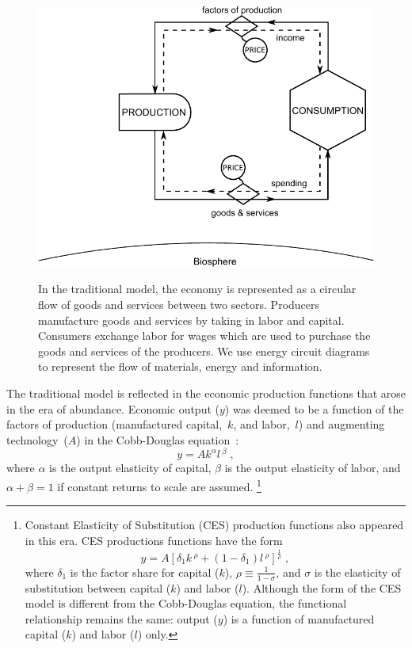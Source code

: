 \begin{figure}[!ht]
\centering\
\includegraphics[width=\linewidth]{Part_0/Chapter_Acct_For_WoN/images/Perpetual_motion_1.pdf}
\caption[The traditional model]{In the traditional model, the economy 
is represented as a circular flow of goods and services between two sectors. 
Producers manufacture goods and services 
by taking in labor and capital. 
Consumers exchange labor for wages 
which are used to purchase 
the goods and services of the producers.
We use energy circuit diagrams to represent the flow of 
materials, energy and information.\cite{Odum1996}}
\label{fig:perp_motion_1}
\end{figure}

The traditional model is reflected in the economic production functions
that arose in the era of abundance. 
Economic output ($y$) was deemed to be a function 
of the factors of production (manufactured capital,~$k$, and labor,~$l$)
and augmenting technology~($A$) in the Cobb-Douglas equation~\cite{Solow:1956wj}:
%
\begin{equation} \label{eq:cobb-douglas}
	y = A k^{\alpha} l \, ^\beta \; ,
\end{equation}	 
%
where $\alpha$ is the output elasticity of capital, $\beta$ is the output elasticity
of labor, and $\alpha + \beta = 1$ if constant returns to scale are assumed.%
	\footnote{
	Constant Elasticity of Substitution (CES) production functions also appeared 
	in this era.
	CES productions functions have the form
	\begin{equation*}
		y = A \left[ \delta_1 k \, ^\rho + (1-\delta_1) l \, ^\rho    \right]^{\frac{1}{\rho}} \; ,
	\end{equation*}
	where $\delta_1$ is the factor share for capital ($k$),
	$\rho \equiv \frac{1}{1-\sigma}$, and 
	$\sigma$ is the elasticity of substitution 
	between capital ($k$) and labor ($l$).\cite{Solow:1956wj}
	Although the form of the CES model is different from 
	the Cobb-Douglas equation, 
	the functional relationship remains the same: 
	output ($y$) is a function of manufactured capital ($k$) and labor ($l$) only.
	}

